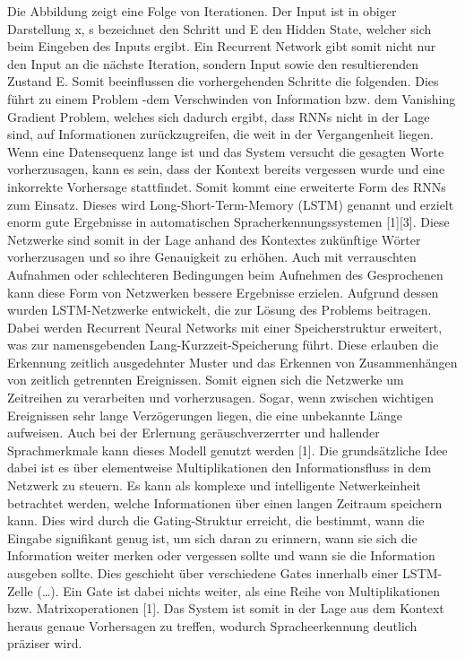 Die Abbildung zeigt eine Folge von Iterationen. Der Input ist in obiger Darstellung x, s bezeichnet den Schritt und E den Hidden State, welcher sich beim Eingeben des Inputs ergibt. Ein Recurrent Network gibt somit nicht nur den Input an die nächste Iteration, sondern Input sowie den resultierenden Zustand E. Somit beeinflussen die vorhergehenden Schritte die folgenden. Dies führt zu einem Problem -dem Verschwinden von Information bzw. dem Vanishing Gradient Problem, welches sich dadurch ergibt, dass RNNs nicht in der Lage sind, auf Informationen zurückzugreifen, die weit in der Vergangenheit liegen.
Wenn eine Datensequenz lange ist und das System versucht die gesagten Worte vorherzusagen, kann es sein, dass der Kontext bereits vergessen wurde und eine inkorrekte Vorhersage stattfindet. Somit kommt eine erweiterte Form des RNNs zum Einsatz. Dieses wird Long-Short-Term-Memory (LSTM) genannt und erzielt enorm gute Ergebnisse in automatischen Spracherkennungssystemen [1][3]. 
Diese Netzwerke sind somit in der Lage anhand des Kontextes zukünftige Wörter vorherzusagen und so ihre Genauigkeit zu erhöhen.  Auch mit verrauschten Aufnahmen oder schlechteren Bedingungen beim Aufnehmen des Gesprochenen kann diese Form von Netzwerken bessere Ergebnisse erzielen. 
Aufgrund dessen wurden LSTM-Netzwerke entwickelt, die zur Lösung des Problems beitragen. Dabei werden Recurrent Neural Networks mit einer Speicherstruktur erweitert, was zur namensgebenden Lang-Kurzzeit-Speicherung führt. Diese erlauben die Erkennung zeitlich ausgedehnter Muster und das Erkennen von Zusammenhängen von zeitlich getrennten Ereignissen. Somit eignen sich die Netzwerke um Zeitreihen zu verarbeiten und vorherzusagen. Sogar, wenn zwischen wichtigen Ereignissen sehr lange Verzögerungen liegen, die eine unbekannte Länge aufweisen. Auch bei der Erlernung geräuschverzerrter und hallender Sprachmerkmale kann dieses Modell genutzt werden [1]. 
Die grundsätzliche Idee dabei ist es über elementweise Multiplikationen den Informationsfluss in dem Netzwerk zu steuern. Es kann als komplexe und intelligente Netwerkeinheit betrachtet werden, welche Informationen über einen langen Zeitraum speichern kann. Dies wird durch die Gating-Struktur erreicht, die bestimmt, wann die Eingabe signifikant genug ist, um sich daran zu erinnern, wann sie sich die Information weiter merken oder vergessen sollte und wann sie die Information ausgeben sollte. Dies geschieht über verschiedene Gates innerhalb einer LSTM-Zelle (…). Ein Gate ist dabei nichts weiter, als eine Reihe von Multiplikationen bzw. Matrixoperationen [1]. 
Das System ist somit in der Lage aus dem Kontext heraus genaue Vorhersagen zu treffen, wodurch Spracheerkennung deutlich präziser wird. 
